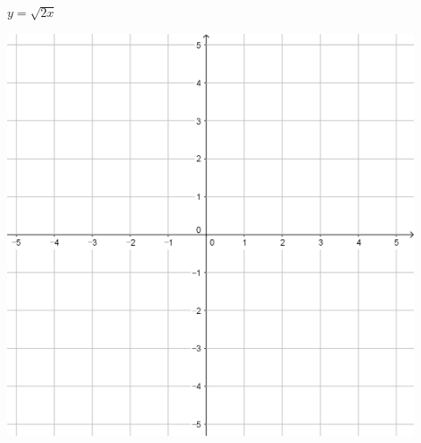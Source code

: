 \documentclass{oblivoir}
\begin{document}
\begin{minipage}{0.45\textwidth}\centering
\(y=\sqrt{2x}\)
\par\bigskip\includegraphics[width=0.9\textwidth]{55}
\end{minipage}\bigskip\bigskip\par
\end{document}
